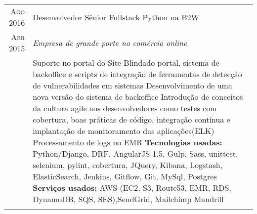 \documentclass[a4paper,10pt]{article}
\begin{document}
\begin{tabular}{r|p{11cm}}
 \textsc{Ago 2016} & Desenvolvedor Sênior Fullstack Python na \textsc{B2W} \\\textsc{Abr 2015}&\emph{Empresa de grande porte no comércio online }\\&\footnotesize{
  Suporte no portal do Site Blindado portal, sistema de backoffice e scripts de integração de ferramentas de detecção de vulnerabilidades em sistemas\newline
  Desenvolvimento de uma nova versão do sistema de backoffice\newline
  Introdução de conceitos da cultura agile aos desenvolvedores como testes com cobertura, boas práticas de código, integração contínua e implantação de monitoramento das aplicações(ELK) \newline
  Processamento de logs no EMR\newline    
\textbf{Tecnologias usadas:} Python/Django, DRF, AngularJS 1.5, Gulp, Sass, unittest, selenium, pylint, cobertura, JQuery, Kibana, Logstash, ElasticSearch, Jenkins, Gitflow, Git, MySql, Postgres\newline
\textbf{Serviços usados:} AWS (EC2, S3, Route53, EMR, RDS, DynamoDB, SQS, SES),SendGrid, Mailchimp Mandrill}\\\multicolumn{2}{c}{} \\


 
 \end{tabular}
 \newpage
\end{document}
